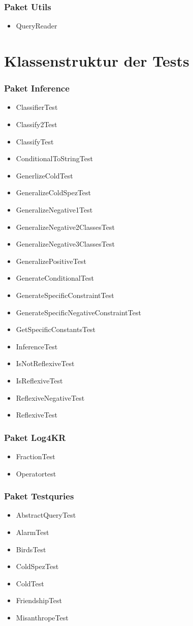 \documentclass[a4paper, 11pt]{book}
\begin{document}
{\subsubsection{Paket Utils}
\begin{itemize}
	\item QueryReader
\end{itemize}
\section{Klassenstruktur der Tests}
\subsubsection{Paket Inference}
\begin{itemize}
	\item ClassifierTest
	\item Classify2Test
	\item ClassifyTest
	\item ConditionalToStringTest
	\item GenerlizeColdTest
	\item GeneralizeColdSpezTest
	\item GeneralizeNegative1Test
	\item GeneralizeNegative2ClassesTest
	\item GeneralizeNegative3ClassesTest
	\item GeneralizePositiveTest
	\item GenerateConditionalTest
	\item GenerateSpecificConstraintTest
	\item GenerateSpecificNegativeConstraintTest
	\item GetSpecificConstantsTest
	\item InferenceTest
	\item IsNotReflexiveTest
	\item IsReflexiveTest
	\item ReflexiveNegativeTest
	\item ReflexiveTest
\end{itemize}
\subsubsection{Paket Log4KR}
\begin{itemize}
	\item FractionTest
	\item Operatortest
\end{itemize}
\subsubsection{Paket Testquries}
\begin{itemize}
	\item AbstractQueryTest
	\item AlarmTest
	\item BirdsTest
	\item ColdSpezTest
	\item ColdTest
	\item FriendshipTest
	\item MisanthropeTest
	

\end{itemize}}
\end{document}
